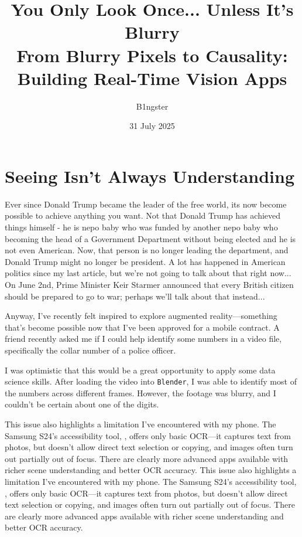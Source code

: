 \documentclass{article}
\title{
    You Only Look Once... Unless It's Blurry \\
    \large From Blurry Pixels to Causality: Building Real-Time Vision Apps
}
\author{B1ngster}
\date{31 July 2025}
\newcommand{\clicks}[2]{\href{https://#1}{\colorlet{temp}{.}\color{blue}{\underline{\color{temp}#2}}\color{temp}}}
\newcommand{\cmdname}[1]{\texttt{#1}}
\begin{document}
\maketitle
\newpage
 
\section*{Seeing Isn’t Always Understanding}


Ever since Donald Trump became the leader of the free world, its now become possible to achieve anything you want. Not that Donald Trump has achieved things himself - he is nepo baby who was funded by another nepo baby who becoming the head of a Government Department without being elected and he is not even American. Now, that person is no longer leading the department, and Donald Trump might no longer be president. A lot has happened in American politics since my last article, but we're not going to talk about that right now... On June 2nd, Prime Minister Keir Starmer announced that every British citizen should be prepared to go to war; perhaps we'll talk about that instead...


Anyway, I've recently felt inspired to explore augmented reality—something that's become possible now that I've been approved for a mobile contract. A friend recently asked me if I could help identify some numbers in a video file, specifically the collar number of a police officer.

I was optimistic that this would be a great opportunity to apply some data science skills. After loading the video into \cmdname{Blender}, I was able to identify most of the numbers across different frames. However, the footage was blurry, and I couldn't be certain about one of the digits.

This issue also highlights a limitation I’ve encountered with my phone. The Samsung S24’s accessibility tool, \clicks{www.samsung.com}{Bixby Vision}, offers only basic OCR—it captures text from photos, but doesn’t allow direct text selection or copying, and images often turn out partially out of focus. There are clearly more advanced apps available with richer scene understanding and better OCR accuracy.
This issue also highlights a limitation I’ve encountered with my phone. The Samsung S24’s accessibility tool, \clicks{www.samsung.com}{Bixby Vision}, offers only basic OCR—it captures text from photos, but doesn’t allow direct text selection or copying, and images often turn out partially out of focus. There are clearly more advanced apps available with richer scene understanding and better OCR accuracy.
\end{document}
